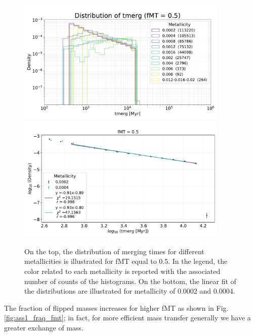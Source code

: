 \documentclass[prb,twocolumn,9pt]{revtex4-1}
\begin{document}
\begin{figure}[htp]
    \begin{minipage}[l]{1.0\columnwidth}
    \centering
    \includegraphics[width=0.9\textwidth]{images/assignment1/hist_time_tmerg.pdf} \\
     \includegraphics[width=0.9\textwidth]{images/assignment1/fit_hist_time_tmerg.pdf}
    \end{minipage}
    \caption{On the top, the distribution of merging times for different metallicities is illustrated for  fMT equal to 0.5. In the legend, the color related to each metallicity is reported  with the associated number of counts of the histograms. On the bottom, the linear fit of the distributions are illustrated for metallicity of 0.0002 and 0.0004.}
    \label{fig:ass1_tmerg}
\end{figure}

The fraction of flipped masses increases for higher fMT as shown in Fig. \ref{fig:ass1_fraq_fmt}; in fact, for more efficient mass transfer generally we have a greater exchange of mass.
\end{document}
